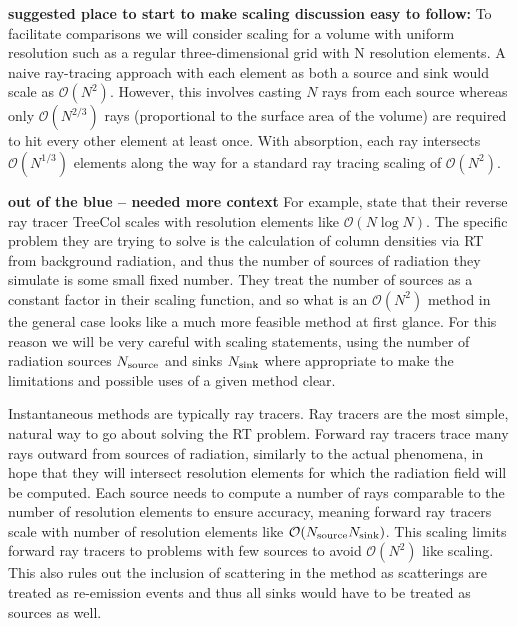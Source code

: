 \documentclass[fleqn,usenatbib]{mnras}
\begin{document}
{\bf suggested place to start to make scaling discussion easy to follow:}
To facilitate comparisons we will consider scaling for a volume with
uniform resolution such as a regular three-dimensional grid with N
resolution elements.  A naive ray-tracing
approach with each element as both a source and sink would scale as
$\mathcal{O}(N^2)$.  However, this involves casting $N$ rays from each
source whereas only $\mathcal{O}(N^{2/3})$ rays (proportional to the surface area of the volume) 
are required to hit every other element at least once.  With absorption, 
each ray intersects $\mathcal{O}(N^{1/3})$ elements along the way
for a standard ray tracing scaling of $\mathcal{O}(N^2)$.

{\bf out of the blue -- needed more context}
For example, \cite{clarkEt12}
 state that their reverse ray tracer TreeCol scales with resolution elements 
like $\mathcal{O}(N\log{N})$. The specific problem they are trying to solve is 
the calculation of column densities via RT from background radiation, and thus
the number of sources of radiation they simulate is some small fixed number. 
They treat the number of sources as a constant factor in their scaling 
function, and so what is an $\mathcal{O}(N^2)$ method in the general case 
looks like a much more feasible method at first glance. For this reason we will
be very careful with scaling statements, using the number of radiation sources 
$N_{\rm source}$ and sinks $N_{\rm sink}$ where appropriate to make the 
limitations and possible uses of a given method clear.

Instantaneous methods are typically ray tracers. Ray tracers are the most
 simple, natural way to go about solving the RT problem. Forward ray tracers 
trace many rays outward from sources of radiation, similarly to the actual 
phenomena, in hope that they will intersect resolution elements for which the 
radiation field will be computed. Each source needs to compute a number of rays
 comparable to the number of resolution elements to ensure accuracy, 
meaning forward ray tracers scale with number of resolution elements like 
$\mathcal{O}(N_{\rm source} N_{\rm sink})$. This scaling limits forward ray 
tracers to problems with few sources to avoid $\mathcal{O}(N^2)$ like scaling. 
This also rules out the inclusion of scattering in the method as scatterings 
are treated as re-emission events and thus all sinks would have to be treated 
as sources as well. 
\end{document}
